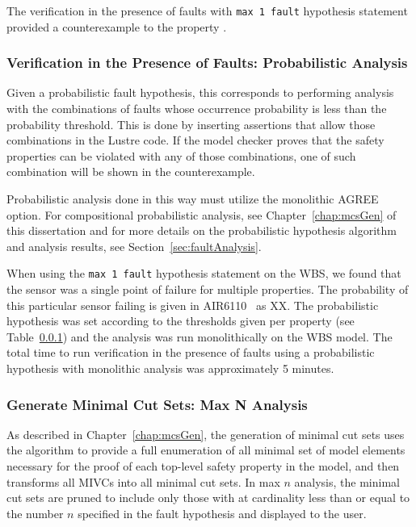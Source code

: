 The verification in the presence of faults with \texttt{max 1 fault} hypothesis statement  provided a counterexample to the property {\em }. 

\subsubsection{Verification in the Presence of Faults: Probabilistic Analysis} 
Given a probabilistic fault hypothesis, this corresponds to performing analysis with the combinations of faults whose occurrence probability is less than the probability threshold. This is done by inserting assertions that allow those combinations in the Lustre code. If the model checker proves that the safety properties can be violated with any of those combinations, one of such combination will be shown in the counterexample. 

Probabilistic analysis done in this way must utilize the monolithic AGREE option. For compositional probabilistic analysis, see Chapter~\ref{chap:mcsGen} of this dissertation and for more details on the probabilistic hypothesis algorithm and analysis results, see Section~\ref{sec:faultAnalysis}. 

When using the \texttt{max 1 fault} hypothesis statement on the WBS, we found that the sensor was a single point of failure for multiple properties. The probability of this particular sensor failing is given in AIR6110~\cite{} as XX. The probabilistic hypothesis was set according to the thresholds given per property (see Table~\ref{}) and the analysis was run monolithically on the WBS model. The total time to run verification in the presence of faults using a probabilistic hypothesis with monolithic analysis was approximately 5 minutes. 


\subsubsection{Generate Minimal Cut Sets: Max N Analysis}
\label{sec:maxN_generate}
As described in Chapter~\ref{chap:mcsGen}, the generation of minimal cut sets uses the \aivcalg algorithm to provide a full enumeration of all minimal set of model elements necessary for the proof of each top-level safety property in the model, and then transforms all MIVCs into all minimal cut sets. In max $n$ analysis, the minimal cut sets are pruned to include only those with at cardinality less than or equal to the number $n$ specified in the fault hypothesis and displayed to the user.


